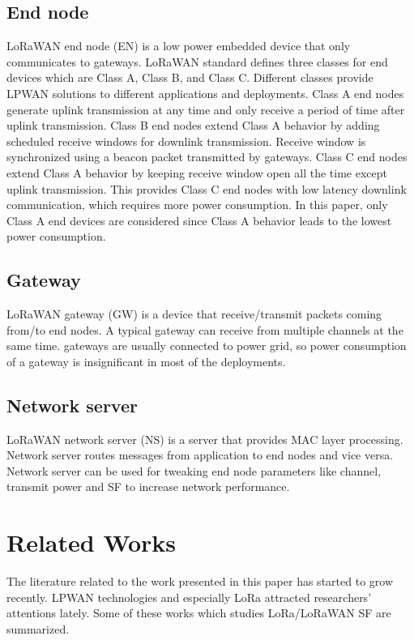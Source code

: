 \documentclass[conference]{IEEEtran}
\begin{document}
\subsection{End node}
LoRaWAN end node (EN) is a low power embedded device that only communicates to gateways. LoRaWAN standard defines three classes for end devices which are Class A, Class B, and Class C. Different classes provide LPWAN solutions to different applications and deployments. Class A end nodes generate uplink transmission at any time and only receive a period of time after uplink transmission. Class B end nodes extend Class A behavior by adding scheduled receive windows for downlink transmission. Receive window is synchronized using a beacon packet transmitted by gateways. Class C end nodes extend Class A behavior by keeping receive window open all the time except uplink transmission. This provides Class C end nodes with low latency downlink communication, which requires more power consumption. In this paper, only Class A end devices are considered since Class A behavior leads to the lowest power consumption.

\subsection{Gateway}
LoRaWAN gateway (GW) is a device that receive/transmit packets coming from/to end nodes. A typical gateway can receive from multiple channels at the same time. gateways are usually connected to power grid, so power consumption of a gateway is insignificant in most of the deployments.

\subsection{Network server}
LoRaWAN network server (NS) is a server that provides MAC layer processing. Network server routes messages from application to end nodes and vice versa. Network server can be used for tweaking end node parameters like channel, transmit power and SF to increase network performance.


\section{Related Works} \label{Related Works}
The literature related to the work presented in this paper has started to grow recently. LPWAN technologies and especially LoRa attracted researchers’ attentions lately. Some of these works which studies LoRa/LoRaWAN SF are summarized.
\end{document}

